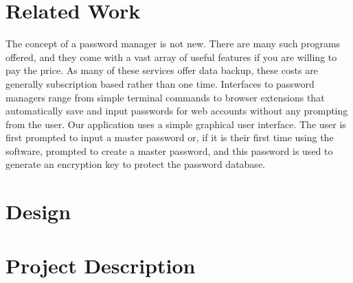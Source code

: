 \documentclass [oneside, letterpaper] {article}
\begin{document}
    \section {Related Work}
        The concept of a password manager is not new. There are many such
        programs offered, and they come with a vast array of useful features if
        you are willing to pay the price. As many of these services offer data
        backup, these costs are generally subscription based rather than one
        time. Interfaces to password managers range from simple terminal
        commands to browser extensions that automatically save and input
        passwords for web accounts without any prompting from the user. Our
        application uses a simple graphical user interface. The user is first
        prompted to input a master password or, if it is their first time using
        the software, prompted to create a master password, and this password is
        used to generate an encryption key to protect the password database.

    \section {Design}


    \section {Project Description}
\end{document}
